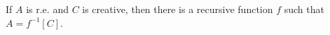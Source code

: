 If $A$ is r.e. and $C$ is creative, then there is a recursive function $f$ such that $A = f^{-1}[C]$.

